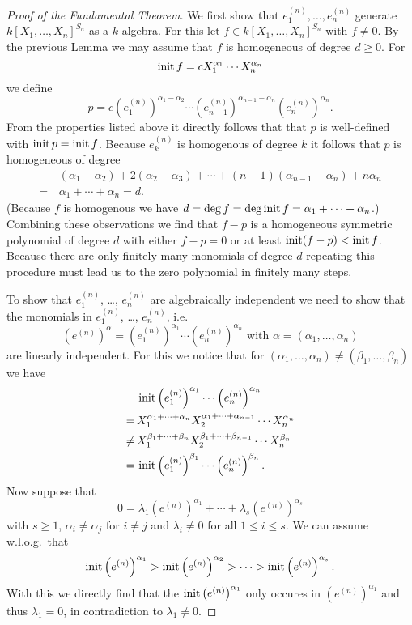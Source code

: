 \begin{proof}[Proof of the Fundamental Theorem]
 We first show that $e^{(n)}_1, \dotsc, e^{(n)}_n$ generate $k[X_1, \dotsc, X_n]^{S_n}$ as a $k$-algebra. For this let $f \in k[X_1, \dotsc, X_n]^{S_n}$ with $f \neq 0$. By the previous Lemma we may assume that $f$ is homogeneous of degree $d \geq 0$. For
 \[
  \operatorname{init} f = c X_1^{\alpha_1} \dotsm X_n^{\alpha_n}
 \]
 we define
 \[
  p = c \left(e^{(n)}_1\right)^{\alpha_1 - \alpha_2} \dotsm \left(e^{(n)}_{n-1}\right)^{\alpha_{n-1} - \alpha_n} \left(e^{(n)}_n\right)^{\alpha_n}.
 \]
 From the properties listed above it directly follows that that $p$ is well-defined with $\operatorname{init} p = \operatorname{init} f$. Because $e^{(n)}_k$ is homogenous of degree $k$ it follows that $p$ is homogeneous of degree
 \begin{align*}
   &\,(\alpha_1-\alpha_2) + 2(\alpha_2-\alpha_3) + \dotsb + (n-1)(\alpha_{n-1}-\alpha_n)+n\alpha_n \\
  =&\, \alpha_1 + \dotsb + \alpha_n
  = d.
 \end{align*}
 (Because $f$ is homogenous we have $d = \deg f = \deg \operatorname{init} f = \alpha_1 + \dotsb + \alpha_n$.) Combining these observations we find that $f-p$ is a homogeneous symmetric polynomial of degree $d$ with either $f-p = 0$ or at least $\operatorname{init} (f-p) < \operatorname{init} f$. Because there are only finitely many monomials of degree $d$ repeating this procedure must lead us to the zero polynomial in finitely many steps.
 
 To show that $e^{(n)}_1$, \dots, $e^{(n)}_n$ are algebraically independent we need to show that the monomials in $e^{(n)}_1$, \dots, $e^{(n)}_n$, i.e.
 \[
  \left(e^{(n)}\right)^\alpha = \left(e^{(n)}_1\right)^{\alpha_1} \dotsm \left(e^{(n)}_n\right)^{\alpha_n} \text{ with } \alpha = (\alpha_1, \dotsc, \alpha_n)
 \]
 are linearly independent. For this we notice that for $(\alpha_1, \dotsc, \alpha_n) \neq (\beta_1, \dotsc, \beta_n)$ we have
 \begin{align*}
      &\, \operatorname{init} \left(e^{(n)}_1\right)^{\alpha_1} \dotsm \left(e^{(n)}_n\right)^{\alpha_n} \\
     =&\, X_1^{\alpha_1 + \dotsb + \alpha_n} X_2^{\alpha_1 + \dotsb + \alpha_{n-1}} \dotsm X_n^{\alpha_n} \\
  \neq&\, X_1^{\beta_1 + \dotsb + \beta_n} X_2^{\beta_1 + \dotsb + \beta_{n-1}} \dotsm X_n^{\beta_n} \\
     =&\, \operatorname{init} \left(e^{(n)}_1\right)^{\beta_1} \dotsm \left(e^{(n)}_n\right)^{\beta_n}.
 \end{align*}
 Now suppose that
 \[
  0 = \lambda_1 \left(e^{(n)}\right)^{\alpha_1} + \dotsb + \lambda_s \left(e^{(n)}\right)^{\alpha_s}
 \]
 with $s \geq 1$, $\alpha_i \neq \alpha_j$ for $i \neq j$ and $\lambda_i \neq 0$ for all $1 \leq i \leq s$. We can assume w.l.o.g.\ that 
 \[
  \operatorname{init} \left(e^{(n)}\right)^{\alpha_1} > \operatorname{init} \left(e^{(n)}\right)^{\alpha_2} > \dotsb > \operatorname{init} \left(e^{(n)}\right)^{\alpha_s}.
 \]
 With this we directly find that the $\operatorname{init} \left(e^{(n)}\right)^{\alpha_1}$ only occures in $\left(e^{(n)}\right)^{\alpha_1}$ and thus $\lambda_1 = 0$, in contradiction to $\lambda_1 \neq 0$.
\end{proof}


